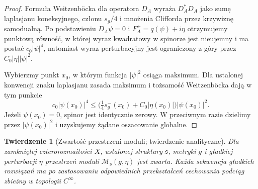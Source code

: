 \documentclass[11pt,a4paper]{report}
\numberwithin{equation}{section}
\theoremstyle{plain}
\newtheorem{twierdzenie}{Twierdzenie}[section]
\theoremstyle{definition}
\theoremstyle{remark}
\begin{document}
\begin{proof}
Formuła Weitzenböcka dla operatora $D_A$ wyraża
$D_A^*D_A$ jako sumę laplasjanu koneksyjnego,
członu $s_g/4$ i mnożenia Clifforda przez krzywiznę
samodualną. Po podstawieniu $D_A\psi=0$ i
$F_A^+=q(\psi)+i\eta$ otrzymujemy punktową równość,
w której wyraz kwadratowy w spinorze jest
nieujemny i ma postać $c_0|\psi|^4$, natomiast
wyraz perturbacyjny jest ograniczony z góry przez
$C_0|\eta||\psi|^2$.

Wybierzmy punkt $x_0$, w którym funkcja $|\psi|^2$
osiąga maksimum. Dla ustalonej konwencji znaku
laplasjanu zasada maksimum i tożsamość Weitzenböcka
dają w tym punkcie
\[
c_0|\psi(x_0)|^4\le
\bigl(\tfrac14s_g^-(x_0)+C_0|\eta(x_0)|\bigr)
|\psi(x_0)|^2.
\]
Jeżeli $\psi(x_0)=0$, spinor jest identycznie zerowy.
W przeciwnym razie dzielimy przez $|\psi(x_0)|^2$
i uzyskujemy żądane oszacowanie globalne.
\end{proof}

\begin{twierdzenie}[Zwartość przestrzeni moduli; twierdzenie analityczne]
\label{thm:tg-sw-compact}
Dla zamkniętej czterorozmaitości $X$, ustalonej struktury
$\mathfrak s$, metryki $g$ i gładkiej perturbacji $\eta$
przestrzeń moduli $\mathcal M_{\mathfrak s}(g,\eta)$
jest zwarta. Każda sekwencja gładkich rozwiązań ma po
zastosowaniu odpowiednich przekształceń cechowania
podciąg zbieżny w topologii $C^\infty$.
\end{twierdzenie}
\end{document}
